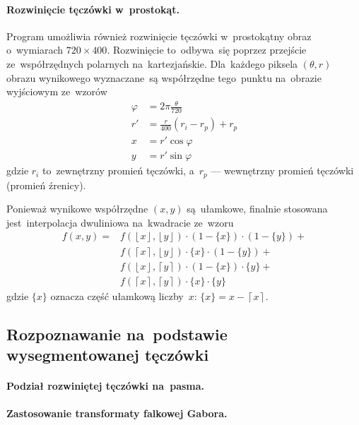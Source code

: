 \documentclass[11pt,a4paper]{article}
\begin{document}
\paragraph{Rozwinięcie tęczówki w~prostokąt.}
Program umożliwia również rozwinięcie tęczówki w~prostokątny obraz o~wymiarach $720 \times 400$.
Rozwinięcie to~odbywa~się poprzez przejście ze~współrzędnych polarnych na~kartezjańskie.
Dla~każdego piksela $(\theta,r)$ obrazu wynikowego wyznaczane~są współrzędne tego~punktu na~obrazie wyjściowym ze~wzorów
\begin{align*}
    \varphi &= 2 \pi \frac{\theta}{720} \\
    r' &= \frac{r}{400} (r_i - r_p) + r_p \\
    x &= r' \cos \varphi \\
    y &= r' \sin \varphi
\end{align*}
gdzie $r_i$ to~zewnętrzny promień tęczówki, a~$r_p$ --- wewnętrzny promień tęczówki (promień źrenicy).

Ponieważ wynikowe współrzędne $(x,y)$ są~ułamkowe, finalnie stosowana jest~interpolacja dwuliniowa na~kwadracie ze~wzoru
\begin{align*}
    f(x, y) = & f(\left\lfloor x \right\rfloor, \left\lfloor y \right\rfloor) \cdot (1 - \{ x \}) \cdot (1 - \{ y \}) + \\
    & f(\left\lceil x \right\rceil, \left\lfloor y \right\rfloor) \cdot \{ x \} \cdot (1 - \{ y \}) + \\
    & f(\left\lfloor x \right\rfloor, \left\lceil y \right\rceil) \cdot (1 - \{ x \}) \cdot \{ y \} + \\
    & f(\left\lceil x \right\rceil, \left\lceil y \right\rceil) \cdot \{ x \} \cdot \{ y \}
\end{align*}
gdzie $\{ x \}$ oznacza część ułamkową liczby~$x$: $\{ x \} = x - \left\lceil x \right\rceil$.

\subsection{Rozpoznawanie na~podstawie wysegmentowanej tęczówki}
\label{subsec:recognition}

\paragraph{Podział rozwiniętej tęczówki na~pasma.}

\paragraph{Zastosowanie transformaty falkowej Gabora.}
\end{document}
